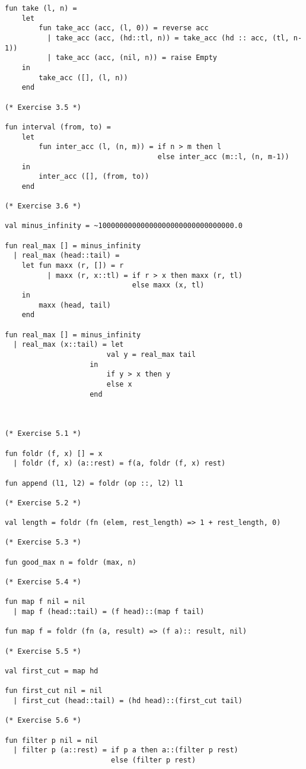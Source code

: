 \begin{verbatim}
fun take (l, n) = 
    let
        fun take_acc (acc, (l, 0)) = reverse acc
          | take_acc (acc, (hd::tl, n)) = take_acc (hd :: acc, (tl, n-1))
          | take_acc (acc, (nil, n)) = raise Empty
    in
        take_acc ([], (l, n))
    end

(* Exercise 3.5 *)

fun interval (from, to) = 
    let
        fun inter_acc (l, (n, m)) = if n > m then l 
                                    else inter_acc (m::l, (n, m-1))
    in
        inter_acc ([], (from, to))
    end

(* Exercise 3.6 *)

val minus_infinity = ~10000000000000000000000000000000.0

fun real_max [] = minus_infinity
  | real_max (head::tail) = 
    let fun maxx (r, []) = r
          | maxx (r, x::tl) = if r > x then maxx (r, tl) 
                              else maxx (x, tl)
    in
        maxx (head, tail)
    end

fun real_max [] = minus_infinity
  | real_max (x::tail) = let 
                        val y = real_max tail
                    in
                        if y > x then y
                        else x
                    end



(* Exercise 5.1 *) 

fun foldr (f, x) [] = x 
  | foldr (f, x) (a::rest) = f(a, foldr (f, x) rest)

fun append (l1, l2) = foldr (op ::, l2) l1

(* Exercise 5.2 *) 

val length = foldr (fn (elem, rest_length) => 1 + rest_length, 0) 

(* Exercise 5.3 *) 

fun good_max n = foldr (max, n)

(* Exercise 5.4 *) 

fun map f nil = nil 
  | map f (head::tail) = (f head)::(map f tail)

fun map f = foldr (fn (a, result) => (f a):: result, nil)

(* Exercise 5.5 *) 

val first_cut = map hd

fun first_cut nil = nil
  | first_cut (head::tail) = (hd head)::(first_cut tail)

(* Exercise 5.6 *) 

fun filter p nil = nil
  | filter p (a::rest) = if p a then a::(filter p rest)
                         else (filter p rest)


\end{verbatim}

